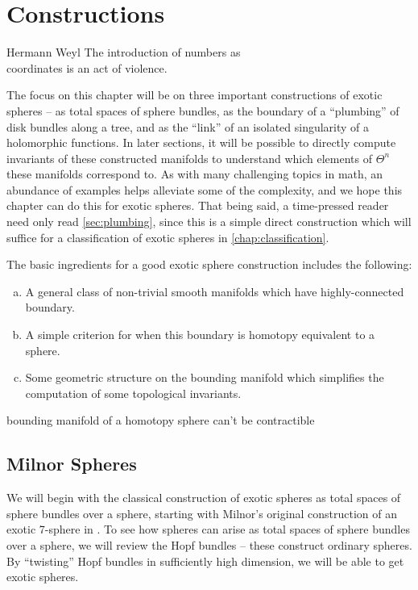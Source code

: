 \chapter{Constructions}\label{chap:constructions}

\begin{epigraph}{14em}{Hermann Weyl}
	The introduction of numbers as \\
	coordinates is an act of violence.
\end{epigraph}

The focus on this chapter will be on three important constructions of exotic spheres -- as total spaces of sphere bundles, as the boundary of a ``plumbing'' of disk bundles along a tree, and as the ``link'' of an isolated singularity of a holomorphic functions. In later sections, it will be possible to directly compute invariants of these constructed manifolds to understand which elements of $\Theta^n$ these manifolds correspond to. As with many challenging topics in math, an abundance of examples helps alleviate some of the complexity, and we hope this chapter can do this for exotic spheres.
That being said, a time-pressed reader need only read \cref{sec:plumbing}, since this is a simple direct construction which will suffice for a classification of exotic spheres in \cref{chap:classification}.

The basic ingredients for a good exotic sphere construction includes the following:
\begin{enumerate}[(a)]
	\item A general class of non-trivial smooth manifolds which have highly-connected boundary.
	\item A simple criterion for when this boundary is homotopy equivalent to a sphere.
	\item Some geometric structure on the bounding manifold which simplifies the computation of some topological invariants.
\end{enumerate}


bounding manifold of a homotopy sphere can't be contractible

\pagebreak
\section{Milnor Spheres}\label{sec:milnor-spheres}

We will begin with the classical construction of exotic spheres as total spaces of sphere bundles over a sphere, starting with Milnor's original construction of an exotic 7-sphere in \cite{milnor1956manifolds}. To see how spheres can arise as total spaces of sphere bundles over a sphere, we will review the Hopf bundles -- these construct ordinary spheres. By ``twisting'' Hopf bundles in sufficiently high dimension, we will be able to get exotic spheres.

